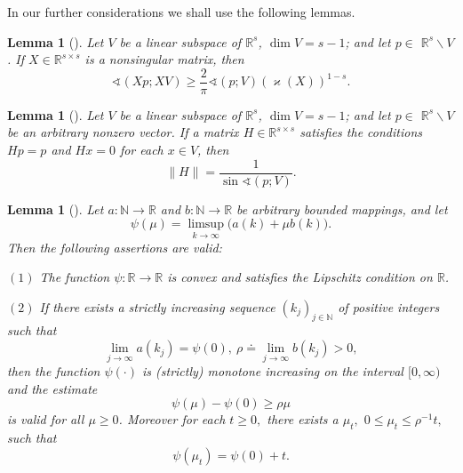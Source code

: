 \documentclass[11pt]{article}
\newtheorem{lemma}[theorem]{Lemma}
\begin{document}
In our further considerations we shall use the following lemmas. 

\begin{lemma}[\protect\cite{Popova2003}]
\label{L1}
\it
Let $V$ be a linear subspace of $\mathbb{R}^{s}$, $\dim V=s-1$;
and let $p\in $ $\mathbb{R}^{s}\backslash V$. If $X\in \mathbb{R}^{s\times
s} $ is a nonsingular matrix, then 
\begin{equation*}
\sphericalangle (Xp;XV)\ge \frac{2}{\pi }\sphericalangle (p;V)(
\varkappa (X)) ^{1-s}.
\end{equation*}
\end{lemma}

\begin{lemma}[\protect\cite{Popova2003}]
\label{L3}
\it
Let $V$ be a linear subspace of $\mathbb{R}^{s}$, $\dim V=s-1$;
and let $p\in $ $\mathbb{R}^{s}\backslash V$ be an arbitrary nonzero vector.
If a matrix $H\in \mathbb{R}^{s\times s}$ satisfies the conditions $Hp=p$
and $Hx=0$ for each $x\in V$, then %
\begin{equation*}
\| H\| =\dfrac{1}{\sin \sphericalangle (p;V)}.
\end{equation*}
\end{lemma}

\begin{lemma}[\protect\cite{Popova2003}]
\label{L2}
\it
Let $a\colon \mathbb{N}\to \mathbb{R}$ and $b\colon 
\mathbb{N}\to \mathbb{R}$ be arbitrary bounded mappings, and let 
\begin{equation*}
\psi (\mu )=\limsup_{k\to \infty }\bigl(a(k)+\mu b(k)\bigr).
\end{equation*}%
Then the following assertions are valid:

$(1)$ The function $\psi\colon\mathbb{R}\to\mathbb{R}$ is convex and
satisfies the Lipschitz condition on $\mathbb{R}$.

$(2)$ If there exists a strictly increasing sequence $( k_{j})
_{j\in \mathbb{N}}$ of positive integers such that%
\begin{equation*}
\lim_{j\to \infty }a( k_{j}) =\psi ( 0) ,\
\rho \doteq \lim_{j\to \infty }b(k_{j})>0,
\end{equation*}%
then the function $\psi (\cdot )$ is (strictly) monotone increasing on the
interval $[ 0,\infty ) $ and the estimate%
\begin{equation*}
\psi ( \mu ) -\psi ( 0) \ge \rho \mu
\end{equation*}%
is valid for all $\mu \ge 0$. Moreover for each $t\ge 0,$ there exists a $%
\mu _{t},$ $0\le \mu _{t}\le \rho ^{-1}t,$ such that 
\begin{equation*}
\psi ( \mu _{t}) =\psi ( 0) +t.
\end{equation*}
\end{lemma}
\end{document}

